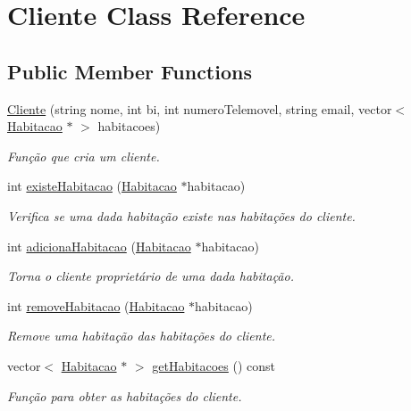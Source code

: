 \hypertarget{class_cliente}{}\section{Cliente Class Reference}
\label{class_cliente}
\subsection*{Public Member Functions}
\begin{DoxyCompactItemize}
\item 
\hyperlink{class_cliente_a9c7edf7c69561bcb1170aa51ea09f0ee}{Cliente} (string nome, int bi, int numero\+Telemovel, string email, vector$<$ \hyperlink{class_habitacao}{Habitacao} $\ast$ $>$ habitacoes)
\begin{DoxyCompactList}\small\item\em Função que cria um cliente. \end{DoxyCompactList}\item 
int \hyperlink{class_cliente_a0ceeca7c7fd8910a7cd169b97cec7825}{existe\+Habitacao} (\hyperlink{class_habitacao}{Habitacao} $\ast$habitacao)
\begin{DoxyCompactList}\small\item\em Verifica se uma dada habitação existe nas habitações do cliente. \end{DoxyCompactList}\item 
int \hyperlink{class_cliente_a5e5c3a99a6b1941e481072240323a878}{adiciona\+Habitacao} (\hyperlink{class_habitacao}{Habitacao} $\ast$habitacao)
\begin{DoxyCompactList}\small\item\em Torna o cliente proprietário de uma dada habitação. \end{DoxyCompactList}\item 
int \hyperlink{class_cliente_af50893954314bc62ee0cef46e33bbb60}{remove\+Habitacao} (\hyperlink{class_habitacao}{Habitacao} $\ast$habitacao)
\begin{DoxyCompactList}\small\item\em Remove uma habitação das habitações do cliente. \end{DoxyCompactList}\item 
vector$<$ \hyperlink{class_habitacao}{Habitacao} $\ast$ $>$ \hyperlink{class_cliente_a6625c1bb73828bcaa067f41b7590408f}{get\+Habitacoes} () const 
\begin{DoxyCompactList}\small\item\em Função para obter as habitações do cliente. \end{DoxyCompactList}\item 

\end{DoxyCompactItemize}
